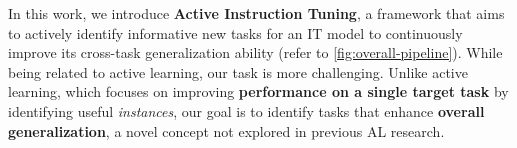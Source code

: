 % 
In this work, we introduce \textbf{Active Instruction Tuning}, a framework that aims to actively identify informative new tasks for an IT model to continuously improve its cross-task generalization ability  (refer to \autoref{fig:overall-pipeline}).
While being related to active learning, our task is more challenging.
Unlike active learning, which focuses on improving \textbf{performance on a single target task} by identifying useful \textit{instances}, our goal is to identify tasks that enhance \textbf{overall generalization}, a novel concept not explored in previous AL research. 

